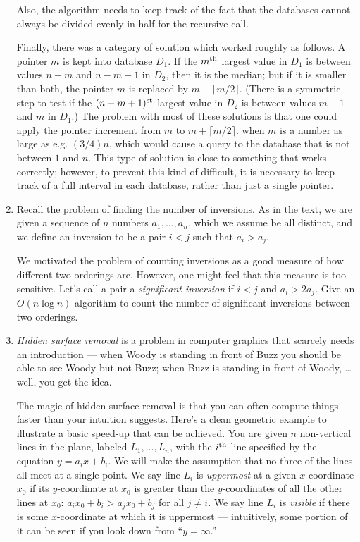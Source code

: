 \documentclass[12pt]{article}
\begin{document}
\begin{enumerate}
{Also, the algorithm needs to keep track of the fact that
the databases cannot always be divided evenly in half
for the recursive call.

Finally, there was a category of solution which worked
roughly as follows.  A pointer $m$ is kept into database $D_1$.
If the $m^{\rm th}$ largest value in $D_1$ is between values
$n-m$ and $n-m+1$ in $D_2$, then it is the median;
but if it is smaller than both, the pointer $m$ is replaced by
$m + \lceil m/2 \rceil$.
(There is a symmetric step to test if the $(n-m+1)^{\rm st}$
largest value in $D_2$ is between values $m-1$ and $m$ in $D_1$.)
The problem with most of these solutions is that one could
apply the pointer increment from $m$ to $m + \lceil m/2 \rceil$.
when $m$ is a number as large as e.g. $(3/4)n$, which would
cause a query to the database that is not between $1$ and $n$.
This type of solution is close to something that works correctly;
however, to prevent this kind of difficult,
it is necessary to keep track of a full interval in
each database, rather than just a single pointer.

}


\item

Recall the problem of finding the number of inversions. As in the
text, we are given a sequence of $n$ numbers $a_1, \ldots, a_n$, which
we assume be all distinct, and we define an
inversion to be a pair $i<j$ such that $a_i > a_j$.

We motivated the problem of
counting inversions as a good measure of how different two orderings are.
However, one might feel that this measure is
too sensitive. Let's call a pair a {\em significant inversion} if
$i <j$ and  $a_i > 2 a_j$. Give an $O(n\log n)$ algorithm to count
the number of significant inversions between two orderings.



\item\Star
{\em Hidden surface removal} is a problem
in computer graphics that scarcely needs an introduction ---
when Woody is standing in front of Buzz you should be
able to see Woody but not Buzz;
when Buzz is standing in front of Woody, \ldots well, you get the idea.

The magic of hidden surface removal is that you can often
compute things faster than your intuition suggests.
Here's a clean geometric example to illustrate a basic speed-up
that can be achieved.
You are given $n$ non-vertical lines in the plane, labeled $L_1, \ldots, L_n$,
with the $i^{\rm th}$ line specified by the equation
$y = a_i x + b_i$.
We will make the assumption that no three of the lines
all meet at a single point.
We say line $L_i$ is {\em uppermost} at a given $x$-coordinate $x_0$ if
its $y$-coordinate at $x_0$ is greater than the $y$-coordinates
of all the other lines at $x_0$:
$a_i x_0 + b_i > a_j x_0 + b_j$ for all $j \neq i$.
We say line $L_i$ is {\em visible} if there is some $x$-coordinate
at which it is uppermost ---
intuitively, some portion
of it can be seen if you look down from ``$y = \infty$.''


\end{enumerate}
\end{document}
